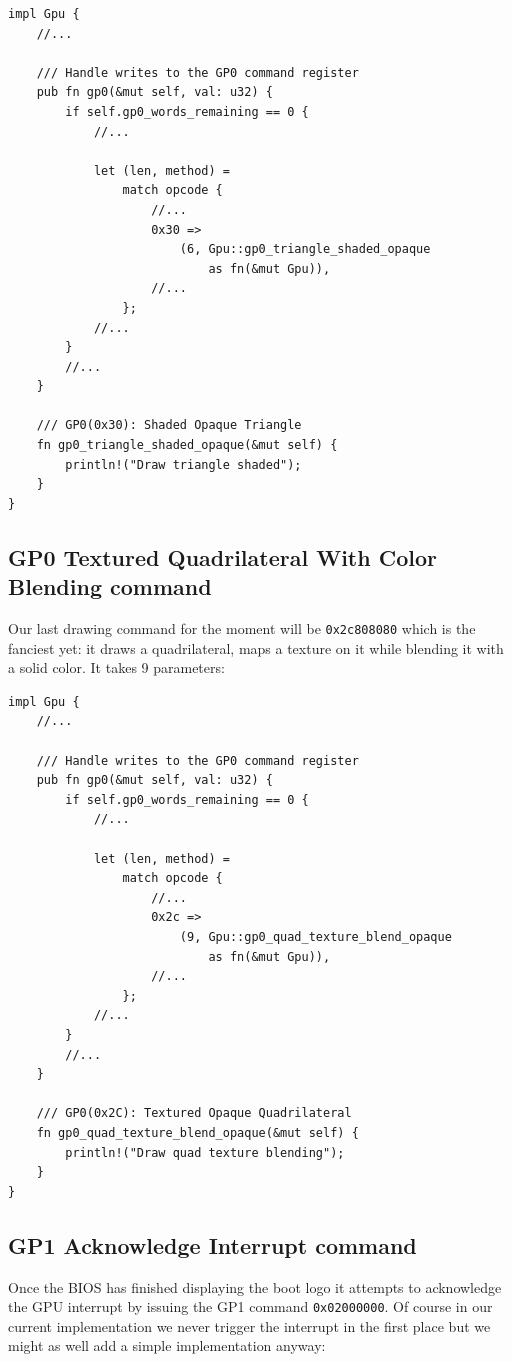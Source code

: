 \documentclass[a4paper]{article}
\newcommand{\code}[1] {\texttt{#1}}
\begin{document}
\begin{lstlisting}
impl Gpu {
    //...

    /// Handle writes to the GP0 command register
    pub fn gp0(&mut self, val: u32) {
        if self.gp0_words_remaining == 0 {
            //...

            let (len, method) =
                match opcode {
                    //...
                    0x30 =>
                        (6, Gpu::gp0_triangle_shaded_opaque
                            as fn(&mut Gpu)),
                    //...
                };
            //...
        }
        //...
    }

    /// GP0(0x30): Shaded Opaque Triangle
    fn gp0_triangle_shaded_opaque(&mut self) {
        println!("Draw triangle shaded");
    }
}
\end{lstlisting}

\subsection{GP0 Textured Quadrilateral With Color Blending command}

Our last drawing command for the moment will be \code{0x2c808080}
which is the fanciest yet: it draws a quadrilateral, maps a texture on
it while blending it with a solid color. It takes 9 parameters:

\begin{lstlisting}
impl Gpu {
    //...

    /// Handle writes to the GP0 command register
    pub fn gp0(&mut self, val: u32) {
        if self.gp0_words_remaining == 0 {
            //...

            let (len, method) =
                match opcode {
                    //...
                    0x2c =>
                        (9, Gpu::gp0_quad_texture_blend_opaque
                            as fn(&mut Gpu)),
                    //...
                };
            //...
        }
        //...
    }

    /// GP0(0x2C): Textured Opaque Quadrilateral
    fn gp0_quad_texture_blend_opaque(&mut self) {
        println!("Draw quad texture blending");
    }
}
\end{lstlisting}

\subsection{GP1 Acknowledge Interrupt command}

Once the BIOS has finished displaying the boot logo it attempts to
acknowledge the GPU interrupt by issuing the GP1 command
\code{0x02000000}. Of course in our current implementation we never
trigger the interrupt in the first place but we might as well add a
simple implementation anyway:
\end{document}
